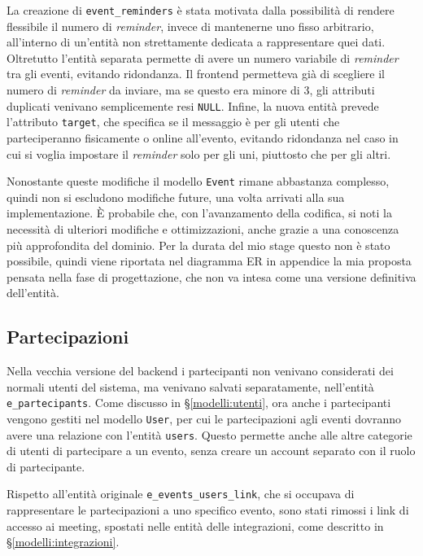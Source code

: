 \noindent La creazione di \verb|event_reminders| è stata motivata dalla possibilità di rendere flessibile il numero di \emph{reminder}, invece di mantenerne uno fisso arbitrario, all'interno di un'entità non strettamente dedicata a rappresentare quei dati. Oltretutto l'entità separata permette di avere un numero variabile di \emph{reminder} tra gli eventi, evitando ridondanza. Il frontend permetteva già di scegliere il numero di \emph{reminder} da inviare, ma se questo era minore di 3, gli attributi duplicati venivano semplicemente resi \verb|NULL|. Infine, la nuova entità prevede l'attributo \verb|target|, che specifica se il messaggio è per gli utenti che parteciperanno fisicamente o online all'evento, evitando ridondanza nel caso in cui si voglia impostare il \emph{reminder} solo per gli uni, piuttosto che per gli altri.

Nonostante queste modifiche il modello \verb|Event| rimane abbastanza complesso, quindi non si escludono modifiche future, una volta arrivati alla sua implementazione. È probabile che, con l'avanzamento della codifica, si noti la necessità di ulteriori modifiche e ottimizzazioni, anche grazie a una conoscenza più approfondita del dominio. Per la durata del mio stage questo non è stato possibile, quindi viene riportata nel diagramma ER in appendice la mia proposta pensata nella fase di progettazione, che non va intesa come una versione definitiva dell'entità.


\subsection{Partecipazioni}
Nella vecchia versione del backend i partecipanti non venivano considerati dei normali utenti del sistema, ma venivano salvati separatamente, nell'entità \verb|e_partecipants|. Come discusso in \S \ref{modelli:utenti}, ora anche i partecipanti vengono gestiti nel modello \verb|User|, per cui le partecipazioni agli eventi dovranno avere una relazione con l'entità \verb|users|. Questo permette anche alle altre categorie di utenti di partecipare a un evento, senza creare un account separato con il ruolo di partecipante.

Rispetto all'entità originale \verb|e_events_users_link|, che si occupava di rappresentare le partecipazioni a uno specifico evento, sono stati rimossi i link di accesso ai meeting, spostati nelle entità delle integrazioni, come descritto in \S \ref{modelli:integrazioni}.

